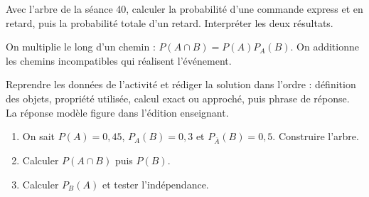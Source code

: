     \begin{activite}
    Avec l'arbre de la séance 40, calculer la probabilité d'une commande express et en retard, puis la probabilité totale d'un retard. Interpréter les deux résultats.
    \begin{center}\end{center}
    \end{activite}

    \begin{traceecrite}On multiplie le long d'un chemin : $P(A\cap B)=P(A)P_A(B)$. On additionne les chemins incompatibles qui réalisent l'événement.\end{traceecrite}

    \begin{exemple}
    Reprendre les données de l'activité et rédiger la solution dans l'ordre : définition des objets, propriété utilisée, calcul exact ou approché, puis phrase de réponse. La réponse modèle figure dans l'édition enseignant.
    \end{exemple}

    \begin{exercice}[-- essentiel]
    \begin{enumerate}\item On sait $P(A)=0{,}45$, $P_A(B)=0{,}3$ et $P_{\overline A}(B)=0{,}5$. Construire l'arbre.\item Calculer $P(A\cap B)$ puis $P(B)$.\item Calculer $P_B(A)$ et tester l'indépendance.\end{enumerate}
    \end{exercice}


